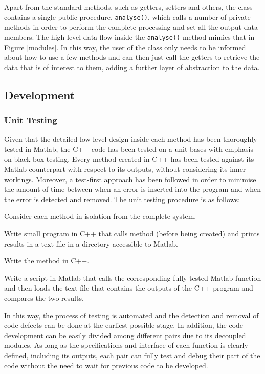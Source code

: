 \documentclass[10pt,a4paper]{article}
\begin{document}
\noindent
Apart from the standard methods, such as getters, setters and others, the class contains a single public procedure, \texttt{analyse()}, which calls a number of private methods in order to perform the complete processing and set all the output data members. The high level data flow inside the \texttt{analyse()} method mimics that in Figure \ref{modules}. In this way, the user of the class only needs to be informed about how to use a few methods and can then just call the getters to retrieve the data that is of interest to them, adding a further layer of abstraction to the data.
\subsection{Development}
\subsubsection{Unit Testing}
\noindent
Given that the detailed low level design inside each method has been thoroughly tested in Matlab, the C++ code has been tested on a unit bases with emphasis on black box testing. Every method created in C++ has been tested against its Matlab counterpart with respect to its outputs, without considering its inner workings. Moreover, a test-first approach has been followed in order to minimise the amount of time between when an error is inserted into the program and when the error is detected and removed. The unit testing procedure is as follows:
\begin{compactitem}
\item Consider each method in isolation from the complete system.
\item Write small program in C++ that calls method (before being created) and prints results in a text file in a directory accessible to Matlab.
\item Write the method in C++.
\item Write a script in Matlab that calls the corresponding fully tested Matlab function and then loads the text file that contains the outputs of the C++ program and compares the two results.
\end{compactitem}

\noindent
In this way, the process of testing is automated and the detection and removal of code defects can be done at the earliest possible stage. In addition, the code development can be easily divided among different pairs due to its decoupled modules. As long as the specifications and interface of each function is clearly defined, including its outputs, each pair can fully test and debug their part of the code without the need to wait for previous code to be developed.
\end{document}
